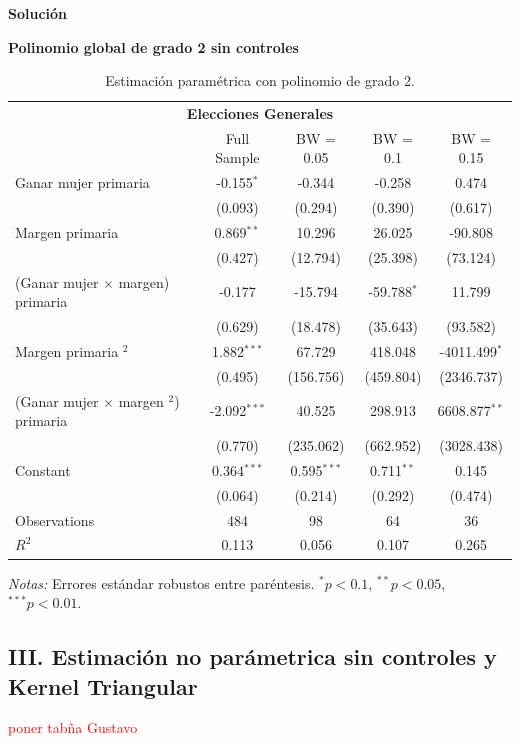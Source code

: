 \documentclass[a4paper, answers, addpoints, 11pt]{exam}
\newenvironment{solucion}{%
  \begin{mdframed}[
    backgroundcolor=blue!5,    %
    linecolor=blue!50,          %
    linewidth=2pt,              %
    leftmargin=10pt,            %
    rightmargin=8pt,           %
    topline=true,              %
    bottomline=true,            %
    roundcorner=10pt,           %
    innerleftmargin=10pt,       %
    innerrightmargin=10pt,      %
    innerbottommargin=10pt,     %
    innertopmargin=10pt         %
  ]%
  \begin{tcolorbox}[colframe=blue!50!black, colback=blue!50, coltitle=white, sharp corners=all, boxrule=1mm, width=\textwidth, halign=left, valign=center, top=0mm, bottom=0mm, left=0mm, right=0mm] \textbf{Solución} \end{tcolorbox} }{\end{mdframed}}
\begin{document}
\begin{enumerate}[resume]
\begin{enumerate}
\begin{solucion}
\textbf{Polinomio global de grado 2 sin controles}\\
\begin{table}[H]
\centering
\caption{Estimación paramétrica con polinomio de grado 2.}
\label{tab:interaction_quadratic}
\begin{tabular}{lcccc}
\toprule
\multicolumn{5}{c}{\textbf{Elecciones Generales}} \\
\cmidrule(lr){2-5}
& Full Sample & BW = 0.05 & BW = 0.1 & BW = 0.15 \\
\midrule
Ganar mujer primaria & -0.155$^{*}$ & -0.344 & -0.258 & 0.474 \\
& (0.093) & (0.294) & (0.390) & (0.617) \\
Margen primaria & 0.869$^{**}$ & 10.296 & 26.025 & -90.808 \\
& (0.427) & (12.794) & (25.398) & (73.124) \\
(Ganar mujer $\times$ margen) primaria & -0.177 & -15.794 & -59.788$^{*}$ & 11.799 \\
& (0.629) & (18.478) & (35.643) & (93.582) \\
Margen primaria $^2$ & 1.882$^{***}$ & 67.729 & 418.048 & -4011.499$^{*}$ \\
& (0.495) & (156.756) & (459.804) & (2346.737) \\
(Ganar mujer $\times$ margen $^2$) primaria  & -2.092$^{***}$ & 40.525 & 298.913 & 6608.877$^{**}$ \\
& (0.770) & (235.062) & (662.952) & (3028.438) \\
Constant & 0.364$^{***}$ & 0.595$^{***}$ & 0.711$^{**}$ & 0.145 \\
& (0.064) & (0.214) & (0.292) & (0.474) \\
\midrule
Observations & 484 & 98 & 64 & 36 \\
$R^2$ & 0.113 & 0.056 & 0.107 & 0.265 \\
\bottomrule
\end{tabular}
\begin{tablenotes}
\small
\item \textit{Notas:} Errores estándar robustos entre paréntesis. $^{*}p<0.1$, $^{**}p<0.05$, $^{***}p<0.01$.
\end{tablenotes}
\end{table}

 \subsection*{III. Estimación no parámetrica sin controles y Kernel Triangular}
 \textcolor{red}{poner tabña Gustavo}

\end{solucion}
\end{enumerate}
\end{enumerate}
\end{document}
